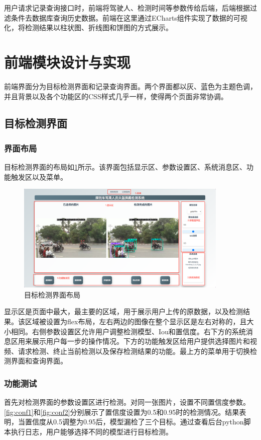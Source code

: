 用户请求记录查询接口时，前端将驾驶人、检测时间等参数传给后端，后端根据过滤条件去数据库查询历史数据。前端在这里通过ECharts组件实现了数据的可视化，将检测结果以柱状图、折线图和饼图的方式展示。


\section{前端模块设计与实现}
前端界面分为目标检测界面和记录查询界面。两个界面都以灰、蓝色为主题色调，并且背景以及各个功能区的CSS样式几乎一样，使得两个页面非常协调。
\subsection{目标检测界面}
\subsubsection{界面布局}
目标检测界面的布局如\ref{fig:detAll}所示。该界面包括显示区、参数设置区、系统消息区、功能触发区以及菜单。

\begin{figure}[!htb]
    \centering
    \includegraphics[width=0.9\textwidth]{figs/chap05/detAll.png}
    \caption{目标检测界面布局}
    \label{fig:detAll}
\end{figure}

显示区是页面中最大，最主要的区域，用于展示用户上传的原数据，以及检测结果。该区域被设置为flex布局，左右两边的图像在整个显示区是左右对称的，且大小相同。右侧参数设置区允许用户调整检测模型、Iou和置信度。右下方的系统消息区用来展示用户每一步的操作情况。下方的功能触发区给用户提供选择图片和视频、请求检测、终止当前检测以及保存检测结果的功能。最上方的菜单用于切换检测界面和查询界面。

\subsubsection{功能测试}
首先对检测界面的参数设置区进行检测。对同一张图片，设置不同置信度参数。\ref{fig:conf1}和\ref{fig:conf2}分别展示了置信度设置为0.5和0.95时的检测情况。结果表明，当置信度从0.5调整为0.95后，模型漏检了三个目标。通过查看后台python脚本执行日志，用户能够选择不同的模型进行目标检测。


